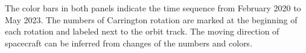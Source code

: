 The color bars in both panels indicate the time sequence from February 2020 to May 2023. The numbers of Carrington rotation  are marked at the beginning of each rotation and labeled next to the orbit track. The moving direction of spacecraft can be inferred from changes of the numbers and colors.






